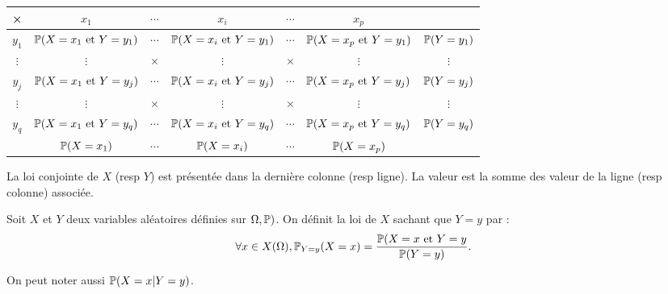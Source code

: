 \begin{center}
\renewcommand{\arraystretch}{1.8}
\begin{tabular}{|c|c|c|c|c|c||c|}\hline
×        & $x_1$                        & $\cdots$ & $x_i$                       & $\cdots$ & $x_p$                        & \\ \hline
$y_1$    & $\mathbb{P}(X=x_1 \text{ et }Y=y_1)$ & $\cdots$ & $\mathbb{P}(X=x_i \text{ et }Y=y_1)$& $\cdots$ & $\mathbb{P}(X=x_p \text{ et }Y=y_1)$ & $\mathbb{P}(Y=y_1)$\\ \hline
$\vdots$ & $\vdots$                     & ×        & $\vdots$                    & ×        & $\vdots$                     &  $\vdots$ \\ \hline
$y_j$    & $\mathbb{P}(X=x_1 \text{ et }Y=y_j)$ & $\cdots$ & $\mathbb{P}(X=x_i \text{ et }Y=y_j)$& $\cdots$ & $\mathbb{P}(X=x_p \text{ et }Y=y_j)$ &  $\mathbb{P}(Y=y_j)$ \\ \hline
$\vdots$ & $\vdots$                     & ×        & $\vdots$                    & ×        & $\vdots$                     &  $\vdots$ \\ \hline
$y_q$    & $\mathbb{P}(X=x_1 \text{ et }Y=y_q)$ & $\cdots$ & $\mathbb{P}(X=x_i \text{ et }Y=y_q)$& $\cdots$ & $\mathbb{P}(X=x_p \text{ et }Y=y_q)$ &  $\mathbb{P}(Y=y_q)$ \\ \hline \hline
         & $\mathbb{P}(X=x_1)$                  & $\cdots$ & $\mathbb{P}(X=x_i)$                 & $\cdots$ & $\mathbb{P}(X=x_p)$& \\ \hline
\end{tabular}
\end{center}
La loi conjointe de $X$ (resp $Y$) est présentée dans la dernière colonne (resp ligne). La valeur est la somme des valeur de la ligne (resp colonne) associée.  
\begin{defi}
  Soit $X$ et $Y$ deux variables aléatoires définies sur $\Omega, \mathbb{P})$. On définit la loi de $X$ sachant que $Y=y$  par :
\[
  \forall x \in X(\Omega), \mathbb{P}_{Y = y}(X = x) = \frac{\mathbb{P}(X=x \text{ et } Y=y}{\mathbb{P}(Y=y)}.
\]
\end{defi}
\begin{nota}
  On peut noter aussi $\mathbb{P}(X=x | Y=y)$.
\end{nota}
\newpage
